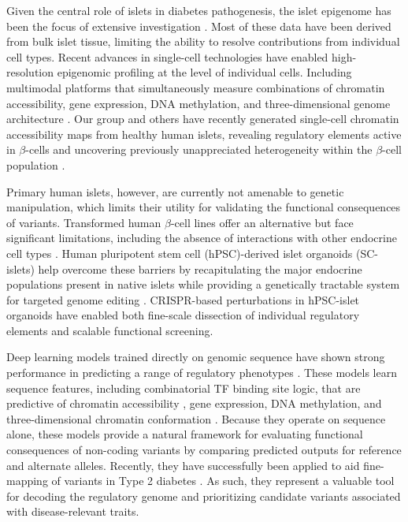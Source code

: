 Given the central role of islets in diabetes pathogenesis, the islet epigenome has been the focus of extensive investigation \cite{Pasquali2014-cu,Gaulton2010-mq,Greenwald2019-ou,Khetan2018-fm,Thurner2018-ln,Volkov2017-tz}. Most of these data have been derived from bulk islet tissue, limiting the ability to resolve contributions from individual cell types. Recent advances in single-cell technologies have enabled high-resolution epigenomic profiling at the level of individual cells. Including multimodal platforms that simultaneously measure combinations of chromatin accessibility, gene expression, DNA methylation, and three-dimensional genome architecture \cite{Lee2019-qo,Liu2021-km}. Our group and others have recently generated single-cell chromatin accessibility maps from healthy human islets, revealing regulatory elements active in $\beta$-cells and uncovering previously unappreciated heterogeneity within the $\beta$-cell population \cite{Chiou2021-ro,Rai2020-cf,Wang2023-me}.

Primary human islets, however, are currently not amenable to genetic manipulation, which limits their utility for validating the functional consequences of variants. Transformed human $\beta$-cell lines \cite{Ravassard2011-lj} offer an alternative but face significant limitations, including the absence of interactions with other endocrine cell types \cite{Rutter2013-yv}. Human pluripotent stem cell (hPSC)-derived islet organoids (SC-islets) help overcome these barriers by recapitulating the major endocrine populations present in native islets \cite{Hogrebe2020-rr,Rezania2014-nz,Veres2019-qb,Velazco-Cruz2019-yq,Zhu2023-qm} while providing a genetically tractable system for targeted genome editing \cite{Komor2016-px}. CRISPR-based perturbations in hPSC-islet organoids have enabled both fine-scale dissection of individual regulatory elements and scalable functional screening.

Deep learning models trained directly on genomic sequence have shown strong performance in predicting a range of regulatory phenotypes \cite{Sasse2024-ly}. These models learn sequence features, including combinatorial TF binding site logic, that are predictive of chromatin accessibility \cite{Pampari2025-lm}, gene expression\cite{Linder2025-or}, DNA methylation\cite{Zeng2017-kb}, and three-dimensional chromatin conformation \cite{Fudenberg2020-gs}. Because they operate on sequence alone, these models provide a natural framework for evaluating functional consequences of non-coding variants by comparing predicted outputs for reference and alternate alleles. Recently, they have successfully been applied to aid fine-mapping of variants in Type 2 diabetes \cite{Hudaiberdiev2023-ew}. As such, they represent a valuable tool for decoding the regulatory genome and prioritizing candidate variants associated with disease-relevant traits. 

